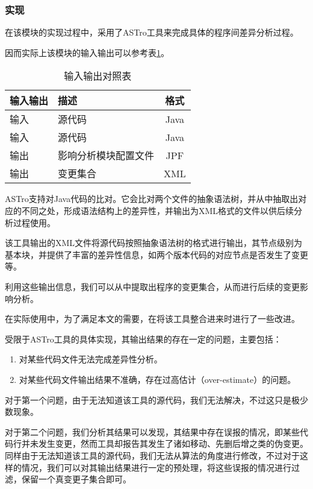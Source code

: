 \subsubsection{实现}

在该模块的实现过程中，采用了ASTro工具来完成具体的程序间差异分析过程。

因而实际上该模块的输入输出可以参考表\ref {differ_io2}。

\begin{table}[H]
	\caption{输入输出对照表}
	\label{differ_io2}
	\centering
	\begin{tabular}{llc}
		\toprule[1.5pt]
		{\heiti 输入输出} & {\heiti 描述} & {\heiti 格式}\\\midrule[1pt]
		输入 & 源代码 & Java\\
		输入 & 源代码 & Java\\
		输出 & 影响分析模块配置文件 & JPF\\
		输出 & 变更集合 & XML\\
		\bottomrule[1.5pt]
	\end{tabular}
\end{table}

ASTro支持对Java代码的比对。它会比对两个文件的抽象语法树，并从中抽取出对应的不同之处，形成语法结构上的差异性，并输出为XML格式的文件以供后续分析过程使用。

该工具输出的XML文件将源代码按照抽象语法树的格式进行输出，其节点级别为基本块，并提供了丰富的差异性信息，如两个版本代码的对应节点是否发生了变更等。

利用这些输出信息，我们可以从中提取出程序的变更集合，从而进行后续的变更影响分析。

在实际使用中，为了满足本文的需要，在将该工具整合进来时进行了一些改进。


受限于ASTro工具的具体实现，其输出结果的存在一定的问题，主要包括：
\begin{enumerate}
	\item 对某些代码文件无法完成差异性分析。
	\item 对某些代码文件输出结果不准确，存在过高估计（over-estimate）的问题。
\end{enumerate}

对于第一个问题，由于无法知道该工具的源代码，我们无法解决，不过这只是极少数现象。

对于第二个问题，我们分析其结果可以发现，其结果中存在误报的情况，即某些代码行并未发生变更，然而工具却报告其发生了诸如移动、先删后增之类的伪变更。同样由于无法知道该工具的源代码，我们无法从算法的角度进行修改，不过对于这样的情况，我们可以对其输出结果进行一定的预处理，将这些误报的情况进行过滤，保留一个真变更子集合即可。

